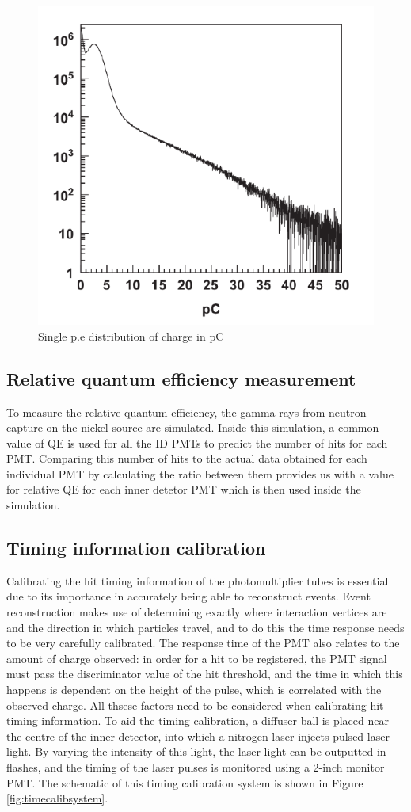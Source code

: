 \begin{figure}
\centering
    \includegraphics[width=.7\textwidth]{Figures/singlepe.png}
\caption{Single p.e distribution of charge in pC \cite{abe_calibration_2014}}
    \label{fig:singlepe}
\end{figure}
    

\subsection{Relative quantum efficiency measurement}

To measure the relative quantum efficiency, the gamma rays from neutron capture on the nickel source are simulated. Inside this simulation, a common value of QE is used for all the ID PMTs to predict the number of hits for each PMT. Comparing this number of hits to the actual data obtained for each individual PMT by calculating the ratio between them provides us with a value for relative QE for each inner detetor PMT which is then used inside the simulation. 

\subsection{Timing information calibration}
Calibrating the hit timing information of the photomultiplier tubes is essential due to its importance in accurately being able to reconstruct events. Event reconstruction makes use of determining exactly where interaction vertices are and the direction in which particles travel, and to do this the time response needs to be very carefully calibrated. The response time of the PMT also relates to the amount of charge observed: in order for a hit to be registered, the PMT signal must pass the discriminator value of the hit threshold, and the time in which this happens is dependent on the height of the pulse, which is correlated with the observed charge. All thsese factors need to be considered when calibrating hit timing information.
\newline
To aid the timing calibration, a diffuser ball is placed near the centre of the inner detector, into which a nitrogen laser injects pulsed laser light. By varying the intensity of this light, the laser light can be outputted in flashes, and the timing of the laser pulses is monitored using a 2-inch monitor PMT. The schematic of this timing calibration system is shown in Figure \ref{fig:timecalibsystem}.

